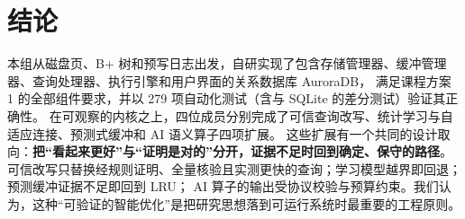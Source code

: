 \documentclass[a4paper,zihao=-4,UTF8,fontset=windows,linespread=1.35]{ctexart}
\begin{document}
\section{结论}
本组从磁盘页、B+ 树和预写日志出发，自研实现了包含存储管理器、缓冲管理器、查询处理器、执行引擎和用户界面的关系数据库 AuroraDB，
满足课程方案 1 的全部组件要求，并以 279 项自动化测试（含与 SQLite 的差分测试）验证其正确性。
在可观察的内核之上，四位成员分别完成了可信查询改写、统计学习与自适应连接、预测式缓冲和 AI 语义算子四项扩展。
这些扩展有一个共同的设计取向：\textbf{把“看起来更好”与“证明是对的”分开，证据不足时回到确定、保守的路径}。
可信改写只替换经规则证明、全量核验且实测更快的查询；学习模型越界即回退；预测缓冲证据不足即回到 LRU；
AI 算子的输出受协议校验与预算约束。我们认为，这种“可验证的智能优化”是把研究思想落到可运行系统时最重要的工程原则。
\end{document}
